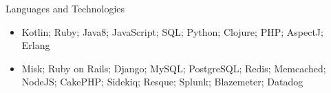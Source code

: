 \documentclass[includefoot]{mcdowellcv}
\begin{document}
	\begin{cvsection}{Languages and Technologies}
		\begin{cvsubsection}{}{}{}	
			\begin{itemize}
				\item Kotlin; Ruby; Java8; JavaScript; SQL; Python; Clojure; PHP; AspectJ; Erlang 
				\item Misk; Ruby on Rails; Django; MySQL; PostgreSQL; Redis; Memcached; NodeJS; CakePHP; Sidekiq; Resque; Splunk; Blazemeter; Datadog
			\end{itemize}
		\end{cvsubsection}
	\end{cvsection}
\end{document}
